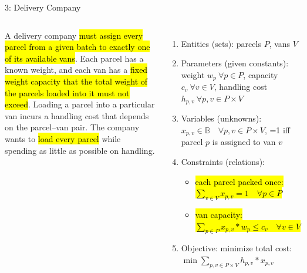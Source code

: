 \documentclass[fleqn,11pt,aspectratio=169]{beamer}
\begin{document}
\begin{frame}{3: Delivery Company}
{\begin{columns}[T]
\begin{block}{}
			A delivery company \hl{must assign every parcel from a given batch to exactly one of its available vans}. Each parcel has a known weight, and each van has a \hl{fixed weight capacity that the total weight of the parcels loaded into it must not exceed}. Loading a parcel into a particular van incurs a handling cost that depends on the parcel–van pair. The company wants to \hl{load every parcel} while spending as little as possible on handling.
		\end{block}
		\begin{enumerate}
			\item Entities (sets): parcels $P$, vans $V$
			\item Parameters (given constants): weight $w_p  \: \forall p \in P$, capacity $c_v  \: \forall v \in V$, handling cost $h_{p,v}  \: \forall p,v \in P \! \times \! V$
			\item Variables (unknowns): $x_{p,v} \in \mathbb{B} \quad \forall p,v \in P \! \times \! V$, =1 iff parcel $p$ is assigned to van $v$
			\item Constraints (relations):
			\begin{itemize}
				\item \hl{each parcel packed once: $\sum_{v\in V} x_{p,v} = 1 \quad \forall p \in P$}
				\item \hl{van capacity: $\sum_{p\in P} x_{p,v} * w_p \leq c_v \quad \forall v \in V$}
			\end{itemize}
			\item Objective: minimize total cost: $\min \sum_{p,v \in P \times V} h_{p,v} * x_{p,v}$
		\end{enumerate}
	\end{columns}
	}
\end{frame}
\end{document}
